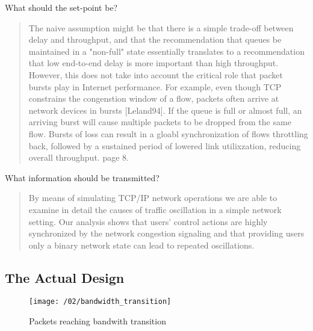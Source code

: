What should the set-point be?

\begin{quote}
The naive assumption might be that there is a simple trade-off between delay and throughput, and
that the recommendation that queues be maintained in a "non-full" state essentially translates
to a recommendation that low end-to-end delay is more important than high throughput. However,
this does not take into account the critical role that packet bursts play in Internet
performance. For example, even though TCP constrains the congenstion window of a flow, packets
often arrive at network devices in bursts [Leland94]. If the queue is full or almost full, an
arriving burst will cause multiple packets to be dropped from the same flow. Bursts of loss can
result in a gloabl synchronization of flows throttling back, followed by a sustained period of
lowered link utilixzation, reducing overall throughput. \cite{rfc7567} page 8.
\end{quote}

What information should be transmitted?

\begin{quote}
By means of simulating TCP/IP network operations we are able to examine in detail the causes of
traffic oscillation in a simple network setting. Our analysis shows that users' control actions
are highly synchronized by the network congestion signaling and that providing users only a
    binary network state can lead to repeated oscillations\cite{zhang1990}.
\end{quote}



\subsection{The Actual Design}


\begin{figure}
\texttt{[image: /02/bandwidth\_transition]}
\caption{Packets reaching bandwith transition}
\label{fig:bandwidth_transition}
\end{figure}



